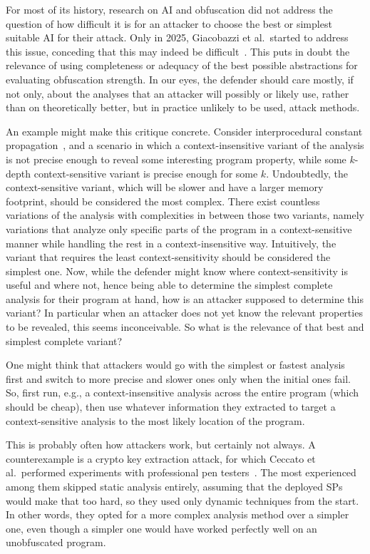 For most of its history, research on AI and obfuscation did not address the question of how difficult it is for an attacker to choose the best or simplest suitable AI for their attack. Only in 2025, Giacobazzi et al.\ started to address this issue, conceding that this may indeed be difficult~\cite{2025roberto}. This puts in doubt the relevance of using completeness or adequacy of the best possible abstractions for evaluating obfuscation strength. In our eyes, the defender should care mostly, if not only, about the analyses that an attacker will possibly or likely use, rather than on theoretically better, but in practice unlikely to be used, attack methods. 

An example might make this critique concrete. Consider interprocedural constant propagation~\cite{interp_cp}, and a scenario in which a context-insensitive variant of the analysis is not precise enough to reveal some interesting program property, while some $k$-depth context-sensitive variant is precise enough for some $k$. Undoubtedly, the context-sensitive variant, which will be slower and have a larger memory footprint, should be considered the most complex. There exist countless variations of the analysis with complexities in between those two variants, namely variations that analyze only specific parts of the program in a context-sensitive manner while handling the rest in a context-insensitive way. Intuitively, the variant that requires the least context-sensitivity should be considered the simplest one. Now, while the defender might know where context-sensitivity is useful and where not, hence being able to determine the simplest complete analysis for their program at hand, how is an attacker supposed to determine this variant? In particular when an attacker does not yet know the relevant properties to be revealed, this seems inconceivable. So what is the relevance of that best and simplest complete variant? 

One might think that attackers would go with the simplest or fastest analysis first and switch to more precise and slower ones only when the initial ones fail. So, first run, e.g., a context-insensitive analysis across the entire program (which should be cheap), then use whatever information they extracted to target a context-sensitive analysis to the most likely location of the program.

This is probably often how attackers work, but certainly not always. A counterexample is a crypto key extraction attack, for which Ceccato et al.\ performed experiments with professional pen testers~\cite{emse2019}. The most experienced among them skipped static analysis entirely, assuming that the deployed SPs would make that too hard, so they used only dynamic techniques from the start. In other words, they opted for a more complex analysis method over a simpler one, even though a simpler one would have worked perfectly well on an unobfuscated program.

